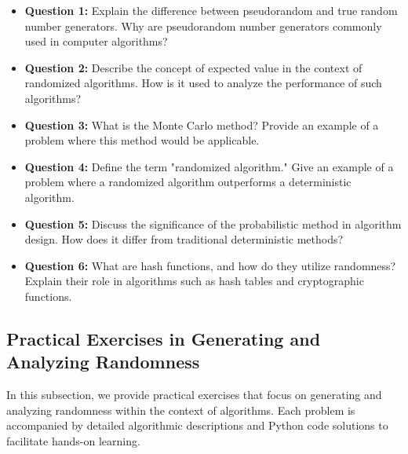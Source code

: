 \documentclass[12pt]{book} %
\begin{document}
\begin{itemize}
    \item \textbf{Question 1:} Explain the difference between pseudorandom and true random number generators. Why are pseudorandom number generators commonly used in computer algorithms?
    \item \textbf{Question 2:} Describe the concept of expected value in the context of randomized algorithms. How is it used to analyze the performance of such algorithms?
    \item \textbf{Question 3:} What is the Monte Carlo method? Provide an example of a problem where this method would be applicable.
    \item \textbf{Question 4:} Define the term "randomized algorithm." Give an example of a problem where a randomized algorithm outperforms a deterministic algorithm.
    \item \textbf{Question 5:} Discuss the significance of the probabilistic method in algorithm design. How does it differ from traditional deterministic methods?
    \item \textbf{Question 6:} What are hash functions, and how do they utilize randomness? Explain their role in algorithms such as hash tables and cryptographic functions.
\end{itemize}

\subsection{Practical Exercises in Generating and Analyzing Randomness}
In this subsection, we provide practical exercises that focus on generating and analyzing randomness within the context of algorithms. Each problem is accompanied by detailed algorithmic descriptions and Python code solutions to facilitate hands-on learning.
\end{document}
